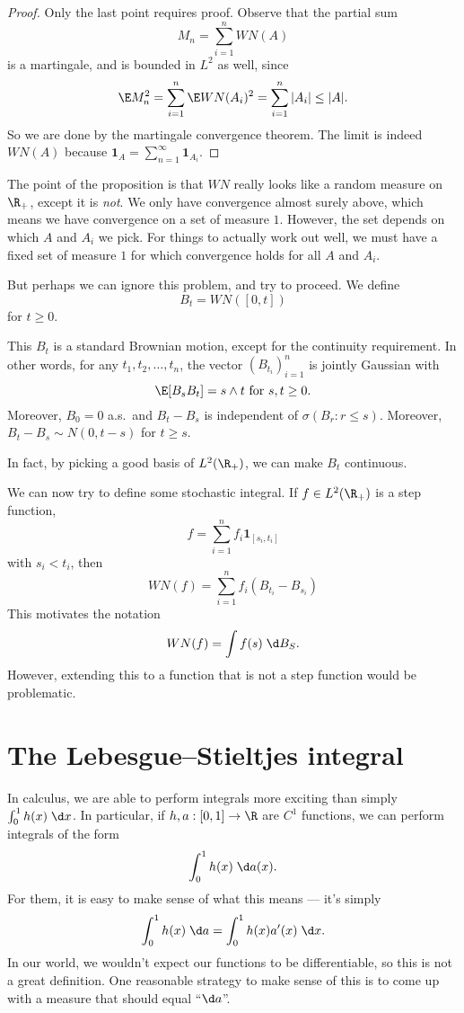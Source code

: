 \documentclass[a4paper]{article}
\begin{document}
\begin{proof}
  Only the last point requires proof. Observe that the partial sum
  \[
    M_n = \sum_{i = 1}^n WN(A)
  \]
  is a martingale, and is bounded in $L^2$ as well, since
  \[
    \E M_n^2 = \sum_{i = 1}^n \E WN(A_i)^2 = \sum_{i = 1}^n |A_i| \leq |A|.
  \]
  So we are done by the martingale convergence theorem. The limit is indeed $WN(A)$ because $\mathbf{1}_A = \sum_{n = 1}^\infty \mathbf{1}_{A_i}$.
\end{proof}
The point of the proposition is that $WN$ really looks like a random measure on $\R_+$, except it is \emph{not}. We only have convergence almost surely above, which means we have convergence on a set of measure $1$. However, the set depends on which $A$ and $A_i$ we pick. For things to actually work out well, we must have a fixed set of measure $1$ for which convergence holds for all $A$ and $A_i$.

But perhaps we can ignore this problem, and try to proceed. We define
\[
  B_t = WN([0, t])
\]
for $t \geq 0$.
\begin{ex}
  This $B_t$ is a standard Brownian motion, except for the continuity requirement. In other words, for any $t_1, t_2, \ldots, t_n$, the vector $(B_{t_i})_{i = 1}^n$ is jointly Gaussian with
  \[
    \E[B_s B_t] = s \wedge t\text{ for }s, t \geq 0.
  \]
  Moreover, $B_0 = 0$ a.s.\ and $B_t - B_s$ is independent of $\sigma(B_r: r \leq s)$. Moreover, $B_t - B_s \sim N(0, t - s)$ for $t \geq s$.
\end{ex}
In fact, by picking a good basis of $L^2(\R_+)$, we can make $B_t$ continuous.

We can now try to define some stochastic integral. If $f \in L^2(\R_+)$ is a step function,
\[
  f = \sum_{i = 1}^n f_i \mathbf{1}_{[s_i, t_i]}
\]
with $s_i < t_i$, then
\[
  WN(f) = \sum_{i = 1}^n f_i (B_{t_i} - B_{s_i})
\]
This motivates the notation
\[
  WN(f) = \int f(s)\; \d B_S.
\]
However, extending this to a function that is not a step function would be problematic.

\section{The Lebesgue--Stieltjes integral}
In calculus, we are able to perform integrals more exciting than simply $\int_0^1 h(x) \;\d x$. In particular, if $h, a: [0, 1] \to \R$ are $C^1$ functions, we can perform integrals of the form
\[
  \int_0^1 h(x) \;\d a(x).
\]
For them, it is easy to make sense of what this means --- it's simply
\[
  \int_0^1 h(x) \;\d a = \int_0^1 h(x) a'(x) \;\d x.
\]
In our world, we wouldn't expect our functions to be differentiable, so this is not a great definition. One reasonable strategy to make sense of this is to come up with a measure that should equal ``$\d a$''.
\end{document}
